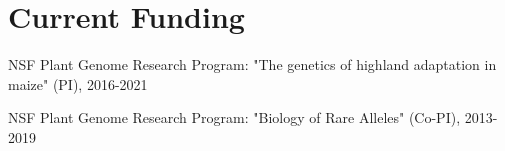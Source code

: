 \documentclass[letterpaper,10pt]{article}
\renewenvironment{itemize}{
  \begin{list}{}{
    \setlength{\leftmargin}{1.5em}
  }
}{
  \end{list}
}
\begin{document}
\section*{Current Funding}
\begin{itemize}
\setlength\itemsep{0ex}
\item NSF Plant Genome Research Program: "The genetics of highland adaptation in maize" (PI), 2016-2021
\item NSF Plant Genome Research Program: "Biology of Rare Alleles" (Co-PI), 2013-2019

\end{itemize}
\end{document}
